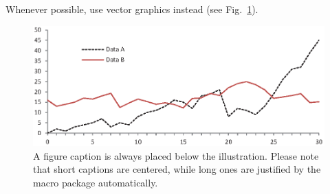 \documentclass[runningheads]{llncs}
\begin{document}
Whenever possible, use vector graphics instead (see
Fig.~\ref{fig1}).

\begin{figure}
\includegraphics[width=\textwidth]{fig1.eps}
\caption{A figure caption is always placed below the illustration.
Please note that short captions are centered, while long ones are
justified by the macro package automatically.} \label{fig1}
\end{figure}



\end{document}
